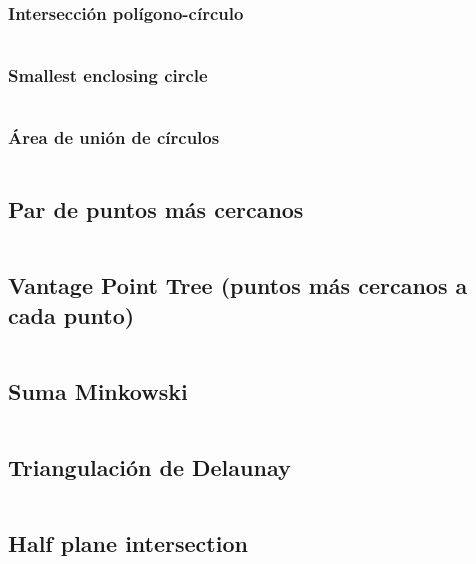 \documentclass[11pt]{article}
\begin{document}
			\subsubsection{Intersección polígono-círculo}
			\inputminted[tabsize=2,breaklines,firstline=419,lastline=454,fontsize=\small]{c++}{geometry.cpp}
			
			\subsubsection{Smallest enclosing circle}
			\inputminted[tabsize=2,breaklines,firstline=456,lastline=487,fontsize=\small]{c++}{geometry.cpp}
			
			\subsubsection{Área de unión de círculos}
			\inputminted[tabsize=2,breaklines,firstline=773,lastline=845,fontsize=\small]{c++}{geometry.cpp}
		
		\subsection{Par de puntos más cercanos}
		\inputminted[tabsize=2,breaklines,firstline=489,lastline=515,fontsize=\small]{c++}{geometry.cpp}
		
		\subsection{Vantage Point Tree (puntos más cercanos a cada punto)}
		\inputminted[tabsize=2,breaklines,firstline=517,lastline=580,fontsize=\small]{c++}{geometry.cpp}
		
		\subsection{Suma Minkowski}
		\inputminted[tabsize=2,breaklines,firstline=582,lastline=603,fontsize=\small]{c++}{geometry.cpp}
		
		\subsection{Triangulación de Delaunay}
		\inputminted[tabsize=2,breaklines,firstline=605,lastline=771,fontsize=\small]{c++}{geometry.cpp}
		
		\subsection{Half plane intersection}
		\inputminted[tabsize=2,breaklines,firstline=847,lastline=920,fontsize=\small]{c++}{geometry.cpp}
		
\end{document}
